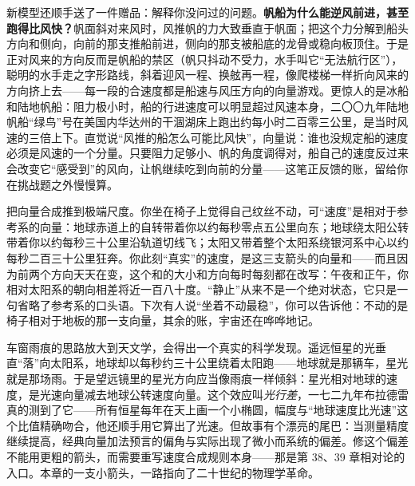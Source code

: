 新模型还顺手送了一件赠品：解释你没问过的问题。\textbf{帆船为什么能逆风前进，甚至跑得比风快？}帆面斜对来风时，风推帆的力大致垂直于帆面；把这个力分解到船头方向和侧向，向前的那支推船前进，侧向的那支被船底的龙骨或稳向板顶住。于是正对风来的方向反而是帆船的禁区（帆只抖动不受力，水手叫它“无法航行区”），聪明的水手走之字形路线，斜着迎风一程、换舷再一程，像爬楼梯一样折向风来的方向挤上去——每一段的合速度都是船速与风压方向的向量游戏。更惊人的是冰船和陆地帆船：阻力极小时，船的行进速度可以明显超过风速本身，二〇〇九年陆地帆船“绿鸟”号在美国内华达州的干涸湖床上跑出约每小时二百零三公里，是当时风速的三倍上下。直觉说“风推的船怎么可能比风快”，向量说：谁也没规定船的速度必须是风速的一个分量。只要阻力足够小、帆的角度调得对，船自己的速度反过来会改变它“感受到”的风向，让帆继续吃到向前的分量——这笔正反馈的账，留给你在挑战题之外慢慢算。


\begin{thought}[你此刻正在以每秒二百三十公里运动]
把向量合成推到极端尺度。你坐在椅子上觉得自己纹丝不动，可“速度”是相对于参考系的向量：地球赤道上的自转带着你以约每秒零点五公里向东；地球绕太阳公转带着你以约每秒三十公里沿轨道切线飞；太阳又带着整个太阳系绕银河系中心以约每秒二百三十公里狂奔。你此刻“真实”的速度，是这三支箭头的向量和——而且因为前两个方向天天在变，这个和的大小和方向每时每刻都在改写：午夜和正午，你相对太阳系的朝向相差将近一百八十度。“静止”从来不是一个绝对状态，它只是一句省略了参考系的口头语。下次有人说“坐着不动最稳”，你可以告诉他：不动的是椅子相对于地板的那一支向量，其余的账，宇宙还在哗哗地记。
\end{thought}

\begin{thought}
车窗雨痕的思路放大到天文学，会得出一个真实的科学发现。遥远恒星的光垂直“落”向太阳系，地球却以每秒约三十公里绕着太阳跑——地球就是那辆车，星光就是那场雨。于是望远镜里的星光方向应当像雨痕一样倾斜：星光相对地球的速度，是光速向量减去地球公转速度向量。这个效应叫\emph{光行差}，一七二九年布拉德雷真的测到了它——所有恒星每年在天上画一个小椭圆，幅度与“地球速度比光速”这个比值精确吻合，他还顺手用它算出了光速。但故事有个漂亮的尾巴：当测量精度继续提高，经典向量加法预言的偏角与实际出现了微小而系统的偏差。修这个偏差不能用更粗的箭头，而需要重写速度合成规则本身——那是第 38、39 章相对论的入口。本章的一支小箭头，一路指向了二十世纪的物理学革命。
\end{thought}

